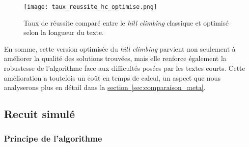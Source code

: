 \documentclass[a4paper]{article}
\begin{document}
\begin{figure}[H]
    \centering
    \texttt{[image: taux\_reussite\_hc\_optimise.png]}
    \caption{Taux de réussite comparé entre le \textit{hill climbing} classique et optimisé selon la longueur du texte.}
    \label{fig:taux_reussite_hc_optimise}
\end{figure}

En somme, cette version optimisée du \textit{hill climbing} parvient non seulement à améliorer la qualité des solutions trouvées, mais elle renforce également la robustesse de l’algorithme face aux difficultés posées par les textes courts. Cette amélioration a toutefois un coût en temps de calcul, un aspect que nous analyserons plus en détail dans la \hyperref[sec:comparaison_meta]{section~\ref*{sec:comparaison_meta}}.

\subsection{Recuit simulé}
\subsubsection{Principe de l'algorithme}
\end{document}
